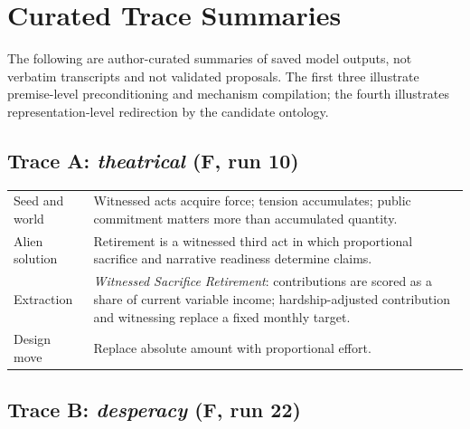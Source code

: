 \documentclass[11pt,a4paper]{article}
\begin{document}



\appendix

\section{Curated Trace Summaries}
\label{sec:appendix-traces}

The following are author-curated summaries of saved model outputs, not verbatim transcripts and not validated proposals. The first three illustrate premise-level preconditioning and mechanism compilation; the fourth illustrates representation-level redirection by the candidate ontology.

\subsection*{Trace A: \emph{theatrical} (F, run 10)}

\begin{center}
\footnotesize
\begin{tabularx}{\textwidth}{>{\raggedright\arraybackslash}p{28mm}X}
\toprule
Seed and world & Witnessed acts acquire force; tension accumulates; public commitment matters more than accumulated quantity. \\
Alien solution & Retirement is a witnessed third act in which proportional sacrifice and narrative readiness determine claims. \\
Extraction & \emph{Witnessed Sacrifice Retirement}: contributions are scored as a share of current variable income; hardship-adjusted contribution and witnessing replace a fixed monthly target. \\
Design move & Replace absolute amount with proportional effort. \\
\bottomrule
\end{tabularx}
\end{center}

\subsection*{Trace B: \emph{desperacy} (F, run 22)}
\end{document}
